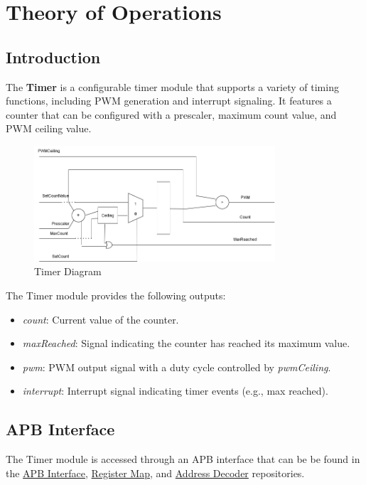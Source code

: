 \section{Theory of Operations}

\subsection{Introduction}
The \textbf{Timer} is a configurable timer module that supports a variety of timing functions,
including PWM generation and interrupt signaling. It features a counter that can be configured with a prescaler,
maximum count value, and PWM ceiling value.

\begin{figure}[h]
  \includegraphics[width=0.80\textwidth]{images/TimerDragram.drawio.png}
  \caption{Timer Diagram}\label{fig:timer-diagram}
\end{figure}

The Timer module provides the following outputs:

\begin{itemize}[noitemsep]
  \item{\textit{count}: Current value of the counter.}
  \item{\textit{maxReached}: Signal indicating the counter has reached its maximum value.}
  \item{\textit{pwm}: PWM output signal with a duty cycle controlled by \textit{pwmCeiling}.}
  \item{\textit{interrupt}: Interrupt signal indicating timer events (e.g., max reached).}
\end{itemize}

\subsection{APB Interface}
The Timer module is accessed through an APB interface that can be be found
in the \href{https://github.com/The-Chiselers/apb}{APB Interface},
\href{https://github.com/The-Chiselers/registermap}{Register Map},
and \href{https://github.com/The-Chiselers/addrdecode}{Address Decoder} repositories.

